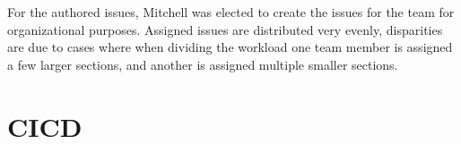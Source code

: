 \documentclass{article}
\begin{document}
For the authored issues, Mitchell was elected to create the issues for the team for organizational purposes. Assigned issues are distributed very evenly, disparities are due to 
cases where when dividing the workload one team member is assigned a few larger sections, and another is assigned multiple smaller sections.

\section{CICD}


\end{document}
